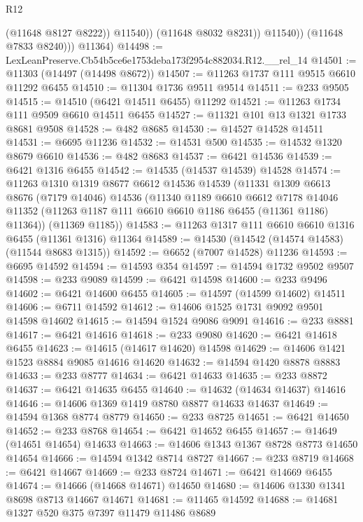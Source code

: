 \begin{lexlean}{R12}
\begin{coremodule}
                      (@11648 @8127 @8222))
                    @11540))
                (@11648 @8032 @8231))
              @11540))
          (@11648 @7833 @8240)))
      @11364)
@14498 := LexLeanPreserve.Cb54b5ce6e1753deba173f2954c882034.R12.__rel_14
@14501 := @11303 (@14497 (@14498 @8672))
@14507 := @11263 @1737 @111 @9515 @6610 @11292 @6455
@14510 := @11304 @1736 @9511 @9514
@14511 := @233 @9505
@14515 := @14510 (@6421 @14511 @6455) @11292
@14521 := @11263 @1734 @111 @9509 @6610 @14511 @6455
@14527 := @11321 @101 @13 @1321 @1733 @8681 @9508
@14528 := @482 @8685
@14530 := @14527 @14528 @14511
@14531 := @6695 @11236
@14532 := @14531 @500
@14535 := @14532 @1320 @8679 @6610
@14536 := @482 @8683
@14537 := @6421 @14536
@14539 := @6421 @1316 @6455
@14542 := @14535 (@14537 @14539) @14528
@14574 := @11263
    @1310
    @1319
    @8677
    @6612
    @14536
    @14539
    (@11331
      @1309
      @6613
      @8676
      (@7179 @14046)
      @14536
      (@11340
        @1189
        @6610
        @6612
        @7178
        @14046
        @11352
        (@11263 @1187 @111 @6610 @6610 @1186 @6455 (@11361 @1186) @11364))
      (@11369 @1185))
@14583 := @11263 @1317 @111 @6610 @6610 @1316 @6455 (@11361 @1316) @11364
@14589 := @14530 (@14542 (@14574 @14583) (@11544 @8683 @1315))
@14592 := @6652 (@7007 @14528) @11236
@14593 := @6695 @14592
@14594 := @14593 @354
@14597 := @14594 @1732 @9502 @9507
@14598 := @233 @9089
@14599 := @6421 @14598
@14600 := @233 @9496
@14602 := @6421 @14600 @6455
@14605 := @14597 (@14599 @14602) @14511
@14606 := @6711 @14592
@14612 := @14606 @1525 @1731 @9092 @9501 @14598 @14602
@14615 := @14594 @1524 @9086 @9091
@14616 := @233 @8881
@14617 := @6421 @14616
@14618 := @233 @9080
@14620 := @6421 @14618 @6455
@14623 := @14615 (@14617 @14620) @14598
@14629 := @14606 @1421 @1523 @8884 @9085 @14616 @14620
@14632 := @14594 @1420 @8878 @8883
@14633 := @233 @8777
@14634 := @6421 @14633
@14635 := @233 @8872
@14637 := @6421 @14635 @6455
@14640 := @14632 (@14634 @14637) @14616
@14646 := @14606 @1369 @1419 @8780 @8877 @14633 @14637
@14649 := @14594 @1368 @8774 @8779
@14650 := @233 @8725
@14651 := @6421 @14650
@14652 := @233 @8768
@14654 := @6421 @14652 @6455
@14657 := @14649 (@14651 @14654) @14633
@14663 := @14606 @1343 @1367 @8728 @8773 @14650 @14654
@14666 := @14594 @1342 @8714 @8727
@14667 := @233 @8719
@14668 := @6421 @14667
@14669 := @233 @8724
@14671 := @6421 @14669 @6455
@14674 := @14666 (@14668 @14671) @14650
@14680 := @14606 @1330 @1341 @8698 @8713 @14667 @14671
@14681 := @11465 @14592
@14688 := @14681 @1327 @520 @375 @7397 @11479 @11486 @8689

\end{coremodule}
\end{lexlean}
